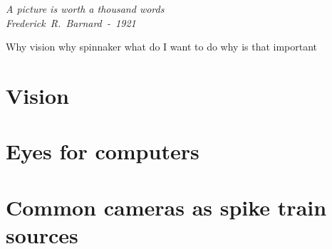 \begin{flushright}
  \vspace*{2em}
  \large{\emph{A picture is worth a thousand words\\
      Frederick~R.~Barnard~-~1921}}
\end{flushright}

Why vision
why spinnaker
what do I want to do
why is that important

\section{Vision}


\section{Eyes for computers}


\section{Common cameras as spike train sources}



